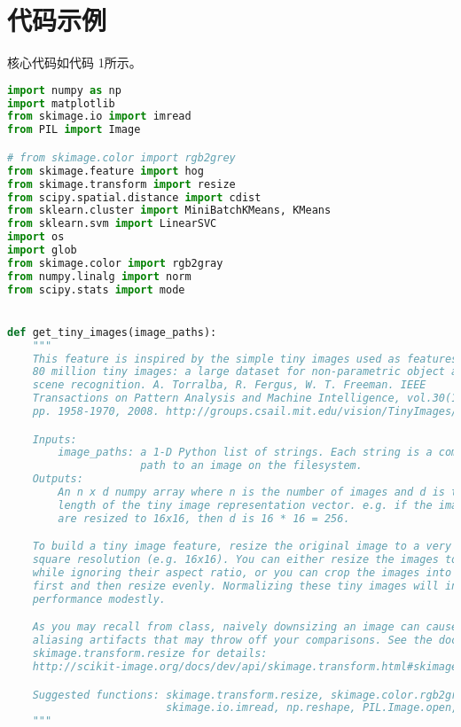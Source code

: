 \section{代码示例}

核心代码如代码 1所示。

\begin{lstlisting}[caption={student.py}, label={l:code-example}, captionpos=t, language=python]
  import numpy as np
import matplotlib
from skimage.io import imread
from PIL import Image

# from skimage.color import rgb2grey
from skimage.feature import hog
from skimage.transform import resize
from scipy.spatial.distance import cdist
from sklearn.cluster import MiniBatchKMeans, KMeans
from sklearn.svm import LinearSVC
import os
import glob
from skimage.color import rgb2gray
from numpy.linalg import norm
from scipy.stats import mode


def get_tiny_images(image_paths):
    """
    This feature is inspired by the simple tiny images used as features in
    80 million tiny images: a large dataset for non-parametric object and
    scene recognition. A. Torralba, R. Fergus, W. T. Freeman. IEEE
    Transactions on Pattern Analysis and Machine Intelligence, vol.30(11),
    pp. 1958-1970, 2008. http://groups.csail.mit.edu/vision/TinyImages/

    Inputs:
        image_paths: a 1-D Python list of strings. Each string is a complete
                     path to an image on the filesystem.
    Outputs:
        An n x d numpy array where n is the number of images and d is the
        length of the tiny image representation vector. e.g. if the images
        are resized to 16x16, then d is 16 * 16 = 256.

    To build a tiny image feature, resize the original image to a very small
    square resolution (e.g. 16x16). You can either resize the images to square
    while ignoring their aspect ratio, or you can crop the images into squares
    first and then resize evenly. Normalizing these tiny images will increase
    performance modestly.

    As you may recall from class, naively downsizing an image can cause
    aliasing artifacts that may throw off your comparisons. See the docs for
    skimage.transform.resize for details:
    http://scikit-image.org/docs/dev/api/skimage.transform.html#skimage.transform.resize

    Suggested functions: skimage.transform.resize, skimage.color.rgb2grey,
                         skimage.io.imread, np.reshape, PIL.Image.open, np.std ...
    """


\end{lstlisting}
